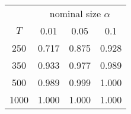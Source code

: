 % 
\begin{tabular}{cccc}
  \hline
  & \multicolumn{3}{c}{nominal size $\alpha$} \\
 $T$ & 0.01 & 0.05 & 0.1 \\
 \hline
250 & 0.717 & 0.875 & 0.928 \\ 
  350 & 0.933 & 0.977 & 0.989 \\ 
  500 & 0.989 & 0.999 & 1.000 \\ 
  1000 & 1.000 & 1.000 & 1.000 \\ 
   \hline
\end{tabular}
